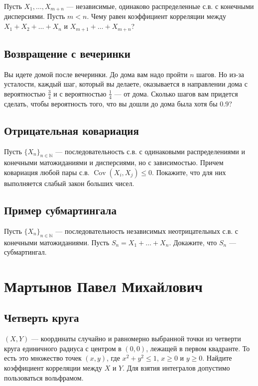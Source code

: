\documentclass[12pt]{article}
\newcommand\N{\mathbb{N}}
\DeclareMathOperator{\Cov}{Cov}
\begin{document}
Пусть $X_1, \dots, X_{m + n}$ --- независимые, одинаково распределенные с.в. с конечными дисперсиями. Пусть $m < n$. Чему равен коэффициент корреляции между $X_1 + X_2 + \dots + X_n$ и $X_{m + 1} + \dots + X_{m + n}$?

\subsection{Возвращение с вечеринки}

Вы идете домой после вечеринки. До дома вам надо пройти $n$ шагов. Но из-за усталости, каждый шаг, который вы делаете, оказывается в направлении дома с вероятностью $\frac{3}{4}$ и с вероятностью $\frac{1}{4}$ --- от дома. Сколько шагов вам придется сделать, чтобы вероятность того, что вы дошли до дома была хотя бы $0.9$?

\subsection{Отрицательная ковариация}

Пусть $\{X_n\}_{n \in \N}$ --- последовательность с.в. с одинаковыми распределениями и конечными матожиданиями и дисперсиями, но с зависимостью. Причем ковариация любой пары с.в. $\Cov(X_i, X_j) \le 0$. Покажите, что для них выполняется слабый закон больших чисел.


\subsection{Пример субмартингала}

Пусть $\{X_n\}_{n \in \N}$ --- последовательность независимых неотрицательных с.в. с конечными матожиданиями. Пусть $S_n = X_1 + \dots + X_n$. Докажите, что $S_n$ --- субмартингал.

\newpage
\section{Мартынов Павел Михайлович}

\subsection{Четверть круга}

$(X, Y)$ --- координаты случайно и равномерно выбранной точки из четверти круга единичного радиуса с центром в $(0, 0)$, лежащей в первом квадранте. То есть это множество точек $(x, y)$, где $x^2 + y^2 \le 1$, $x \ge 0$ и $y \ge 0$. Найдите коэффициент корреляции между $X$ и $Y$. Для взятия интегралов  допустимо пользоваться вольфрамом.
\end{document}
